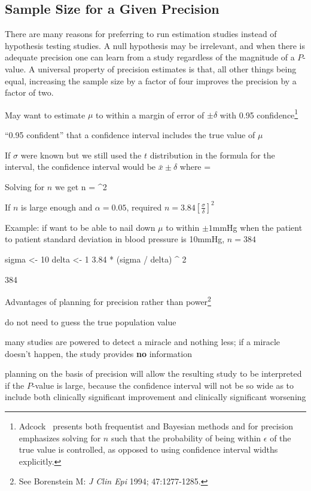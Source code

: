 \subsection{Sample Size for a Given Precision} 
There are many reasons for preferring to run estimation studies
instead of hypothesis testing studies.  A null hypothesis may be
irrelevant, and when there is adequate precision one can learn from a
study regardless of the magnitude of a $P$-value.  A universal
property of precision estimates is that, all other things being equal,
increasing the sample size by a factor of four improves the precision
by a factor of two.
\bi
\item May want to estimate $\mu$ to within a margin of error of $\pm
  \delta$ with 0.95 confidence\footnote{Adcock~\cite{adc97sam}
    presents both frequentist and Bayesian methods and for precision
    emphasizes solving for $n$ such that the probability of being
    within $\epsilon$ of the true value is controlled, as opposed to
    using confidence interval widths explicitly.}
\item ``0.95 confident'' that a confidence interval includes the true
  value of $\mu$
\item If $\sigma$ were known but we still used the $t$ distribution in
  the formula for the interval, the confidence interval would be
  $\bar{x}\pm \delta$ where
\beq
\delta = 
\eeq
\item Solving for $n$ we get
\beq
n = ^{2}
\eeq
\item If $n$ is large enough and $\alpha=0.05$, required
  $n=3.84[\frac{\sigma}{\delta}]^{2}$
\item Example: if want to be able to nail down $\mu$ to within $\pm
  1$mmHg when the patient to patient standard deviation in blood
  pressure is 10mmHg, $n = 384$
\begin{Schunk}
\begin{Sinput}
sigma <- 10
delta <- 1
3.84 * (sigma / delta) ^ 2
\end{Sinput}
\begin{Soutput}
[1] 384
\end{Soutput}
\end{Schunk}
\item Advantages of planning for precision rather than
  power\footnote{See Borenstein M: \emph{J Clin Epi} 1994;
    47:1277-1285.}
 \bi
 \item do not need to guess the true population value
 \item many studies are powered to detect a miracle and nothing less;
   if a miracle doesn't happen, the study provides \textbf{no} information
 \item planning on the basis of precision will allow the resulting
   study to be interpreted if the $P$-value is 
   large, because the confidence interval will not be so wide as to
   include both clinically significant improvement and clinically
   significant worsening
 \ei
\ei

